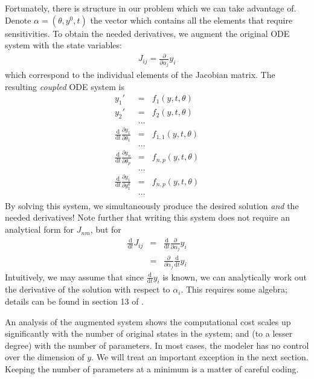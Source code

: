 \documentclass[11pt]{article}
\begin{document}
Fortunately, there is structure in our problem which we can take advantage of.
Denote $\alpha = (\theta, y^0, t)$ the vector which contains all the elements that require sensitivities.
To obtain the needed derivatives, we augment the original ODE system with the state variables:
\begin{eqnarray*}
J_{ij} = \frac{\partial}{\partial \alpha_j}y_i
\end{eqnarray*}
%
which correspond to the individual elements of the Jacobian matrix.
The resulting \textit{coupled} ODE system is
%
  \begin{eqnarray*}
    y_1' & = & f_1(y, t, \theta) \\
    y_2' & = & f_2(y, t, \theta) \\
    & ... & \\
    \frac{\mathrm d}{\mathrm d t} \frac{\partial y_1}{\partial \theta_1} & = & f_{1,1}(y, t, \theta) \\
    & ... &  \\
    \frac{\mathrm d}{\mathrm d t} \frac{\partial y_n}{\partial \theta_p} & = & f_{n, p}(y, t, \theta) \\
    & ... &  \\
    \frac{\mathrm d}{\mathrm d t} \frac{\partial y_1}{\partial y_1^0} & = & f_{n, p}(y, t, \theta)  \\
    & ... & \\
\end{eqnarray*}
%
By solving this system, we simultaneously produce the desired solution \textit{and} the needed derivatives!
Note further that writing this system does not require an analytical form for $J_{nm}$,
but for
%
\begin{eqnarray*}
  \frac{\mathrm d}{\mathrm dt} J_{ij} & = & \frac{\mathrm d}{\mathrm dt}  \frac{\partial}{\partial \alpha_j}y_i \\
     & = &  \frac{\partial}{\partial \alpha_j} \frac{\mathrm d}{\mathrm dt} y_i
\end{eqnarray*}
%
Intuitively, we may assume that since $\frac{\mathrm d}{\mathrm dt} y_i$ is known, we can analytically
work out the derivative of the solution with respect to $\alpha_i$.
This requires some algebra; details can be found in section 13 of \cite{Carpenter:2015}.

An analysis of the augmented system shows the computational cost scales up significantly 
with the number of original states in the system; and (to a lesser degree) with the number 
of parameters. In most cases, the modeler has no control over the dimension 
of $y$. We will treat an important exception in the next section. Keeping the number of parameters
 at a minimum is a matter of careful coding.
\end{document}
